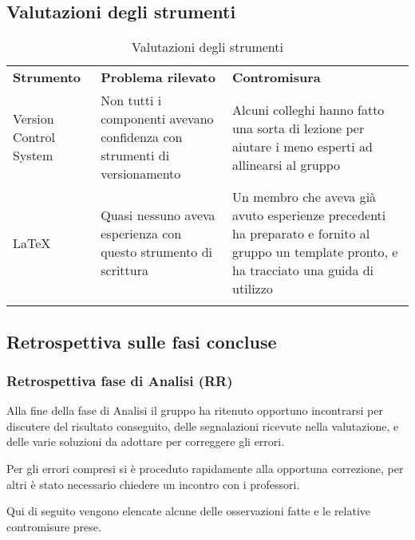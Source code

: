\documentclass[../piano_di_qualifica.tex]{subfiles}
\begin{document}
\subsection{Valutazioni degli strumenti}
\label{sub:valut_strumenti}

\begin{center}
	\begin{longtable}{|p{3cm}|p{4.5cm}|p{4.5cm}|}
		\hline
		\rowcolor{lightgray}
		\textbf{Strumento}                                                       & \textbf{Problema rilevato} & \textbf{Contromisura} \\
		Version Control System & Non tutti i componenti avevano confidenza con strumenti di versionamento & Alcuni colleghi hanno fatto una sorta di lezione per aiutare i meno esperti ad allinearsi al gruppo \\
		\LaTeX & Quasi nessuno aveva esperienza con questo strumento di scrittura & Un membro che aveva già avuto esperienze precedenti ha preparato e fornito al gruppo un template pronto, e ha tracciato una guida di utilizzo \\
		\hline
		\rowcolor{white}
		\caption{Valutazioni degli strumenti}
	\end{longtable}
\end{center}

\subsection{Retrospettiva sulle fasi concluse}
\label{sub:retrospettiva}

\subsubsection{Retrospettiva fase di Analisi (RR)}
\label{par:retrospettiva-RR}
Alla fine della fase di Analisi il gruppo ha ritenuto opportuno incontrarsi per discutere del risultato conseguito, delle segnalazioni ricevute nella valutazione, e delle varie soluzioni da adottare per correggere gli errori.

Per gli errori compresi si è proceduto rapidamente alla opportuna correzione, per altri è stato necessario chiedere un incontro
con i professori.

Qui di seguito vengono elencate alcune delle osservazioni fatte e le relative contromisure prese.
\end{document}
